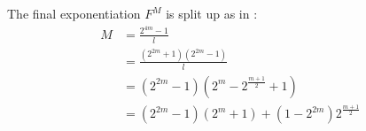The final exponentiation $F^M$ is split up as in \cite{beuchat}:
\begin{displaymath}\begin{aligned}
M	&= \frac{2^{4m} - 1}{l}\\
	&= \frac{(2^{2m} + 1)(2^{2m} - 1)}{l}\\
	&= (2^{2m} - 1)(2^m - 2^{\frac{m + 1}{2}} + 1)\\
	&= (2^{2m} - 1)(2^m + 1) + (1 - 2^{2m})2^{\frac{m + 1}{2}}\\
\end{aligned}\end{displaymath}


